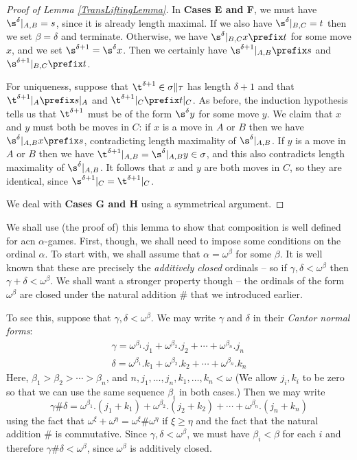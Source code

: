 \documentclass[11pt]{article} %
\begin{document}
\begin{proof}[Proof of Lemma \ref{TransLiftingLemma}]
  In \textbf{Cases E and F}, we must have $\s^\delta\vert_{A,B}=s$, since it is already length maximal.  If we also have $\s^\delta\vert_{B,C}=t$ then we set $\beta=\delta$ and terminate.  Otherwise, we have $\s^\delta\vert_{B,C}x\prefix t$ for some move $x$, and we set $\s^{\delta+1}=\s^\delta x$.  Then we certainly have $\s^{\delta+1}\vert_{A,B}\prefix s$ and $\s^{\delta+1}\vert_{B,C}\prefix t$.  

  For uniqueness, suppose that $\t^{\delta+1}\in\sigma\|\tau$ has length $\delta+1$ and that $\t^{\delta+1}\vert_A\prefix s\vert_A$ and $\t^{\delta+1}\vert_C\prefix t\vert_C$.  As before, the induction hypothesis tells us that $\t^{\delta+1}$ must be of the form $\s^\delta y$ for some move $y$.  We claim that $x$ and $y$ must both be moves in $C$: if $x$ is a move in $A$ or $B$ then we have $\s^\delta\vert_{A,B}x\prefix s$, contradicting length maximality of $\s^\delta\vert_{A,B}$.  If $y$ is a move in $A$ or $B$ then we have $\t^{\delta+1}\vert_{A,B}=\s^\delta\vert_{A,B}y\in\sigma$, and this also contradicts length maximality of $\s^\delta\vert_{A,B}$.  It follows that $x$ and $y$ are both moves in $C$, so they are identical, since $\s^{\delta+1}\vert_C=\t^{\delta+1}\vert_C$.

  We deal with \textbf{Cases G and H} using a symmetrical argument.
\end{proof}

We shall use (the proof of) this lemma to show that composition is well defined for acn $\alpha$-games.  First, though, we shall need to impose some conditions on the ordinal $\alpha$.  To start with, we shall assume that $\alpha=\omega^\beta$ for some $\beta$.  It is well known that these are precisely the \emph{additively closed} ordinals -- so if $\gamma,\delta<\omega^\beta$ then $\gamma+\delta<\omega^\beta$.  We shall want a stronger property though -- the ordinals of the form $\omega^\beta$ are closed under the natural addition $\#$ that we introduced earlier.

To see this, suppose that $\gamma,\delta<\omega^\beta$.  We may write $\gamma$ and $\delta$ in their \emph{Cantor normal forms}:
\begin{gather*}
  \gamma = \omega^{\beta_1}.j_1 + \omega^{\beta_2}.j_2 + \cdots + \omega^{\beta_n}.j_n \\
  \delta = \omega^{\beta_1}.k_1 + \omega^{\beta_2}.k_2 + \cdots + \omega^{\beta_n}.k_n
\end{gather*}
Here, $\beta_1>\beta_2>\cdots>\beta_n$, and $n,j_1,\dots,j_n,k_1,\dots,k_n<\omega$ (We allow $j_i,k_i$ to be zero so that we can use the same sequence $\beta_i$ in both cases.)  Then we may write
\[
  \gamma\#\delta = \omega^{\beta_1}.(j_1+k_1) + \omega^{\beta_2}.(j_2+k_2) + \cdots + \omega^{\beta_n}.(j_n+k_n)
  \]
using the fact that $\omega^\xi+\omega^\eta=\omega^\xi\#\omega^\eta$ if $\xi\ge\eta$ and the fact that the natural addition $\#$ is commutative.  Since $\gamma,\delta<\omega^\beta$, we must have $\beta_i<\beta$ for each $i$ and therefore $\gamma\#\delta<\omega^\beta$, since $\omega^\beta$ is additively closed.
\end{document}
